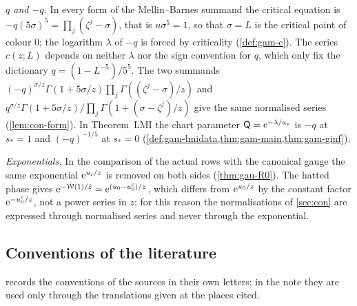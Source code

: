 \emph{$q$ and $-q$.} In every form of the Mellin--Barnes summand the critical equation is $-q(5\sigma)^5=\prod_j(\zeta^j-\sigma)$, that is $u\sigma^5=1$, so that $\sigma=L$ is the critical point of colour $0$; the logarithm $\lambda$ of $-q$ is forced by criticality (\cref{def:gam-c}). The series $c(z;L)$ depends on neither $\lambda$ nor the sign convention for $q$, which only fix the dictionary $q=(1-L^{-5})/5^5$. The two summands $(-q)^{\sigma/z}\Gamma(1+5\sigma/z)\prod_j\Gamma((\zeta^j-\sigma)/z)$ and $q^{\sigma/z}\Gamma(1+5\sigma/z)/\prod_j\Gamma(1+(\sigma-\zeta^j)/z)$ give the same normalised series (\cref{lem:con-form}). In Theorem~LMI the chart parameter $\mathsf Q=\mathrm{e}^{-\lambda/a_*}$ is $-q$ at $s_*=1$ and $(-q)^{-1/5}$ at $s_*=0$ (\cref{def:gam-lmidata,thm:gam-main,thm:gam-ginf}).

\emph{Exponentials.} In the comparison of the actual rows with the canonical gauge the same exponential $\mathrm{e}^{u_i/z}$ is removed on both sides (\cref{thm:gau-R0}). The hatted phase gives $\mathrm{e}^{-\hat{\mathcal{W}}(1)/\hat{z}}=\mathrm{e}^{(u_0-u_0^{\mathrm c})/z}$, which differs from $\mathrm{e}^{u_0/z}$ by the constant factor $\mathrm{e}^{-u_0^{\mathrm c}/z}$, not a power series in $z$; for this reason the normalisations of \cref{sec:con} are expressed through normalised series and never through the exponential.

\subsection{Conventions of the literature}
\label{sec:sgn-lit}

 records the conventions of the sources in their own letters; in the note they are used only through the translations given at the places cited.

